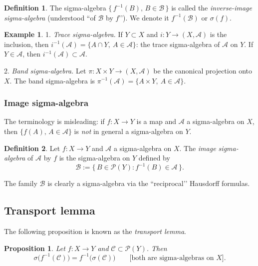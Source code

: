 \documentclass[11pt]{article}
\newtheorem{proposition}{Proposition}[section]
\theoremstyle{definition}
\newtheorem{definition}{Definition}[section]
\newtheorem{example}{Example}[section]
\begin{document}
\begin{definition}
The sigma-algebra $\{\,f^{-1}(B),\, B\in\mathcal B\,\}$ is called the \emph{inverse-image sigma-algebra} (understood “of $\mathcal B$ by $f$’’). We denote it $f^{-1}(\mathcal B)$ or $\sigma(f)$.
\end{definition}

\begin{example}
1. \emph{Trace sigma-algebra.} If $Y\subset X$ and $i:Y\to(X,\mathcal A)$ is the inclusion, then $i^{-1}(\mathcal A)=\{A\cap Y,\ A\in\mathcal A\}$: the trace sigma-algebra of $\mathcal A$ on $Y$. If $Y\in\mathcal A$, then $i^{-1}(\mathcal A)\subset\mathcal A$.

2. \emph{Band sigma-algebra.} Let $\pi:X\times Y\to (X,\mathcal A)$ be the canonical projection onto $X$. The band sigma-algebra is $\pi^{-1}(\mathcal A)=\{A\times Y,\ A\in\mathcal A\}$.
\end{example}

\subsubsection{Image sigma-algebra}

The terminology is misleading: if $f:X\to Y$ is a map and $\mathcal A$ a sigma-algebra on $X$, then $\{f(A),\, A\in\mathcal A\}$ is \emph{not} in general a sigma-algebra on $Y$.

\begin{definition}
Let $f:X\to Y$ and $\mathcal A$ a sigma-algebra on $X$. The \emph{image sigma-algebra} of $\mathcal A$ by $f$ is the sigma-algebra on $Y$ defined by
\[
\mathcal B:=\{\,B\in\mathcal P(Y): f^{-1}(B)\in\mathcal A\,\}.
\]
\end{definition}

The family $\mathcal B$ is clearly a sigma-algebra via the “reciprocal’’ Hausdorff formulas.

\subsection{Transport lemma}\label{subsec:3.3}

The following proposition is known as the \emph{transport lemma}.

\begin{proposition}\label{prop:transport}
Let $f:X\to Y$ and $\mathscr C\subset\mathcal P(Y)$. Then
\[
\sigma\bigl(f^{-1}(\mathscr C)\bigr)=f^{-1}\bigl(\sigma(\mathscr C)\bigr)
\qquad\text{[both are sigma-algebras on $X$].}
\]
\end{proposition}
\end{document}
